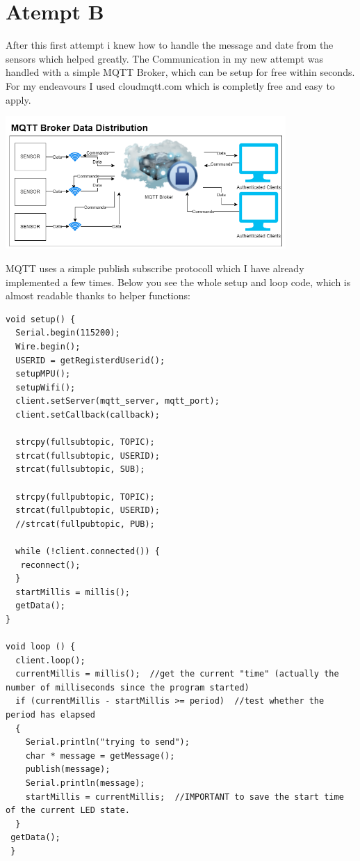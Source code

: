 \section{Atempt B}

After this first attempt i knew how to handle the message and date from the sensors which helped greatly. 
The Communication in my new attempt was handled with a simple MQTT Broker, which can be setup for free within seconds. For my endeavours I used cloudmqtt.com which is completly free and easy to apply. 


\begin{center}
\includegraphics[width=0.8\textwidth]{images/CommunicationDiagrammMQTT.png}
\end{center}
MQTT uses a simple publish subscribe protocoll which I have already implemented a few times.
Below you see the whole setup and loop code, which is almost readable thanks to helper functions:
\begin{lstlisting}
void setup() {
  Serial.begin(115200);
  Wire.begin();
  USERID = getRegisterdUserid();
  setupMPU();
  setupWifi();
  client.setServer(mqtt_server, mqtt_port);
  client.setCallback(callback);

  strcpy(fullsubtopic, TOPIC); 
  strcat(fullsubtopic, USERID);
  strcat(fullsubtopic, SUB);
  
  strcpy(fullpubtopic, TOPIC); 
  strcat(fullpubtopic, USERID);
  //strcat(fullpubtopic, PUB);
  
  while (!client.connected()) {
   reconnect();
  }
  startMillis = millis(); 
  getData();
}

void loop () {
  client.loop();
  currentMillis = millis();  //get the current "time" (actually the number of milliseconds since the program started)
  if (currentMillis - startMillis >= period)  //test whether the period has elapsed
  {
    Serial.println("trying to send");
    char * message = getMessage();
    publish(message);
    Serial.println(message);
    startMillis = currentMillis;  //IMPORTANT to save the start time of the current LED state.
  }
 getData();
 }
\end{lstlisting}

